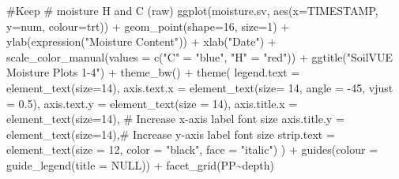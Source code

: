 \documentclass[
  letterpaper,
  DIV=11,
  numbers=noendperiod]{scrartcl}
\newenvironment{Shaded}{\begin{snugshade}}{\end{snugshade}}
\newcommand{\AttributeTok}[1]{\textcolor[rgb]{0.40,0.45,0.13}{#1}}
\newcommand{\CommentTok}[1]{\textcolor[rgb]{0.37,0.37,0.37}{#1}}
\newcommand{\ConstantTok}[1]{\textcolor[rgb]{0.56,0.35,0.01}{#1}}
\newcommand{\DecValTok}[1]{\textcolor[rgb]{0.68,0.00,0.00}{#1}}
\newcommand{\FloatTok}[1]{\textcolor[rgb]{0.68,0.00,0.00}{#1}}
\newcommand{\FunctionTok}[1]{\textcolor[rgb]{0.28,0.35,0.67}{#1}}
\newcommand{\NormalTok}[1]{\textcolor[rgb]{0.00,0.23,0.31}{#1}}
\newcommand{\OtherTok}[1]{\textcolor[rgb]{0.00,0.23,0.31}{#1}}
\newcommand{\SpecialCharTok}[1]{\textcolor[rgb]{0.37,0.37,0.37}{#1}}
\newcommand{\StringTok}[1]{\textcolor[rgb]{0.13,0.47,0.30}{#1}}
\begin{document}
\begin{Shaded}
\begin{Highlighting}[]
\CommentTok{\#Keep}
\CommentTok{\# moisture H and C (raw)}
\FunctionTok{ggplot}\NormalTok{(moisture.sv, }\FunctionTok{aes}\NormalTok{(}\AttributeTok{x=}\NormalTok{TIMESTAMP, }\AttributeTok{y=}\NormalTok{num, }\AttributeTok{colour=}\NormalTok{trt)) }\SpecialCharTok{+}
  \FunctionTok{geom\_point}\NormalTok{(}\AttributeTok{shape=}\DecValTok{16}\NormalTok{, }\AttributeTok{size=}\DecValTok{1}\NormalTok{) }\SpecialCharTok{+} 
  \FunctionTok{ylab}\NormalTok{(}\FunctionTok{expression}\NormalTok{(}\StringTok{"Moisture Content"}\NormalTok{)) }\SpecialCharTok{+}
  \FunctionTok{xlab}\NormalTok{(}\StringTok{"Date"}\NormalTok{) }\SpecialCharTok{+}
  \FunctionTok{scale\_color\_manual}\NormalTok{(}\AttributeTok{values =} \FunctionTok{c}\NormalTok{(}\StringTok{"C"} \OtherTok{=} \StringTok{"blue"}\NormalTok{, }\StringTok{"H"} \OtherTok{=} \StringTok{"red"}\NormalTok{)) }\SpecialCharTok{+}
  \FunctionTok{ggtitle}\NormalTok{(}\StringTok{"SoilVUE Moisture Plots 1{-}4"}\NormalTok{) }\SpecialCharTok{+}
  \FunctionTok{theme\_bw}\NormalTok{() }\SpecialCharTok{+}
  \FunctionTok{theme}\NormalTok{(}
    \AttributeTok{legend.text =} \FunctionTok{element\_text}\NormalTok{(}\AttributeTok{size=}\DecValTok{14}\NormalTok{),}
    \AttributeTok{axis.text.x =} \FunctionTok{element\_text}\NormalTok{(}\AttributeTok{size=} \DecValTok{14}\NormalTok{, }\AttributeTok{angle =} \SpecialCharTok{{-}}\DecValTok{45}\NormalTok{, }\AttributeTok{vjust =} \FloatTok{0.5}\NormalTok{),}
    \AttributeTok{axis.text.y =} \FunctionTok{element\_text}\NormalTok{(}\AttributeTok{size =} \DecValTok{14}\NormalTok{),}
    \AttributeTok{axis.title.x =} \FunctionTok{element\_text}\NormalTok{(}\AttributeTok{size=}\DecValTok{14}\NormalTok{),  }\CommentTok{\# Increase x{-}axis label font size}
    \AttributeTok{axis.title.y =} \FunctionTok{element\_text}\NormalTok{(}\AttributeTok{size=}\DecValTok{14}\NormalTok{),}\CommentTok{\# Increase y{-}axis label font size}
    \AttributeTok{strip.text =} \FunctionTok{element\_text}\NormalTok{(}\AttributeTok{size =} \DecValTok{12}\NormalTok{, }\AttributeTok{color =} \StringTok{"black"}\NormalTok{, }\AttributeTok{face =} \StringTok{"italic"}\NormalTok{)}
\NormalTok{  ) }\SpecialCharTok{+}
  \FunctionTok{guides}\NormalTok{(}\AttributeTok{colour =} \FunctionTok{guide\_legend}\NormalTok{(}\AttributeTok{title =} \ConstantTok{NULL}\NormalTok{)) }\SpecialCharTok{+}
  \FunctionTok{facet\_grid}\NormalTok{(PP}\SpecialCharTok{\textasciitilde{}}\NormalTok{depth)}
\end{Highlighting}
\end{Shaded}
\end{document}
